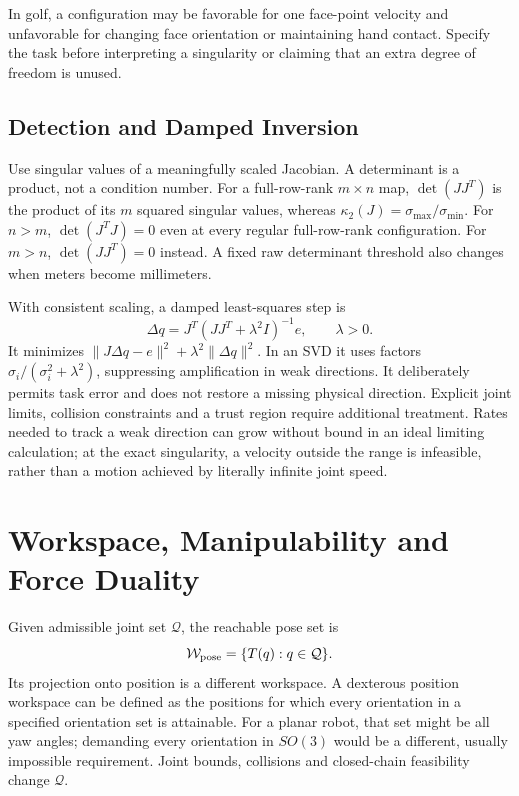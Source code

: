 In golf, a configuration may be favorable for one face-point velocity and unfavorable for changing face orientation or maintaining hand contact. Specify the task before interpreting a singularity or claiming that an extra degree of freedom is unused.

\subsection{Detection and Damped Inversion}
\label{subsec:singularity_handling}

Use singular values of a meaningfully scaled Jacobian. A determinant is a product, not a condition number. For a full-row-rank $m\times n$ map, $\det(JJ^T)$ is the product of its $m$ squared singular values, whereas $\kappa_2(J)=\sigma_{\max}/\sigma_{\min}$. For $n>m$, $\det(J^TJ)=0$ even at every regular full-row-rank configuration. For $m>n$, $\det(JJ^T)=0$ instead. A fixed raw determinant threshold also changes when meters become millimeters.

With consistent scaling, a damped least-squares step is
\begin{equation}
 \Delta q=J^T(JJ^T+\lambda^2 I)^{-1}e,\qquad \lambda>0.
\end{equation}
It minimizes $\|J\Delta q-e\|^2+\lambda^2\|\Delta q\|^2$. In an SVD it uses factors $\sigma_i/(\sigma_i^2+\lambda^2)$, suppressing amplification in weak directions. It deliberately permits task error and does not restore a missing physical direction. Explicit joint limits, collision constraints and a trust region require additional treatment. Rates needed to track a weak direction can grow without bound in an ideal limiting calculation; at the exact singularity, a velocity outside the range is infeasible, rather than a motion achieved by literally infinite joint speed.

\section{Workspace, Manipulability and Force Duality}
\label{sec:workspace_manipulability}
\label{def:reachable_workspace}

Given admissible joint set $\mathcal Q$, the reachable pose set is
\begin{equation}
 \label{eq:reachable_workspace}
 \mathcal W_{\rm pose}=\{T(q):q\in\mathcal Q\}.
\end{equation}
Its projection onto position is a different workspace. A dexterous position workspace can be defined as the positions for which every orientation in a specified orientation set is attainable. For a planar robot, that set might be all yaw angles; demanding every orientation in $SO(3)$ would be a different, usually impossible requirement. Joint bounds, collisions and closed-chain feasibility change $\mathcal Q$.

